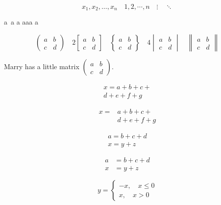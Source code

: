 \documentclass{article}
\begin{document}
\[ x_1,x_2,\dots,x_n\quad 1,2,\cdots,n\quad
\vdots\quad \ddots \]

a\, a\: a\; a\quad a\qquad a\! a

\[ \begin{pmatrix} a&b\\c&d \end{pmatrix} \quad
2 \begin{bmatrix} a&b\\c&d \end{bmatrix} \quad
\begin{Bmatrix} a&b\\c&d \end{Bmatrix} \quad
4 \begin{vmatrix} a&b\\c&d \end{vmatrix} \quad
\begin{Vmatrix} a&b\\c&d \end{Vmatrix} \]

Marry has a little matrix $ ( \begin{smallmatrix}
    a&b\\c&d \end{smallmatrix} ) $.

\begin{multline}
    x = a+b+c+ \\
    d+e+f+g
\end{multline}

\[ \begin{split}
    x = &a+b+c+ \\
    &d+e+f+g
\end{split} \]

\begin{gather}
    a = b+c+d \\
    x = y+z
\end{gather}

\begin{align}
    a &= b+c+d \\
    x &= y+z
\end{align}

\[ 
y=
\begin{cases}
    -x,\quad x\leq 0 \\ 
    x,\quad x>0
\end{cases} 
\]
\end{document}
